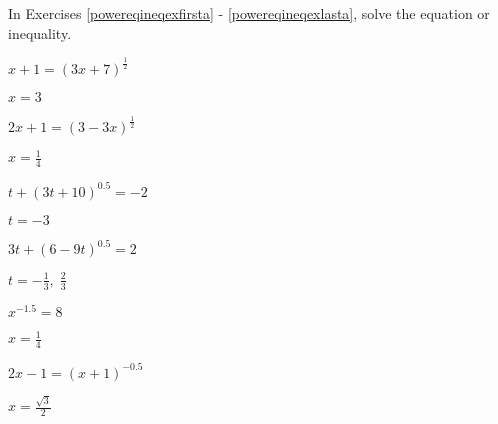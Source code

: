 \documentclass{ximera}
\begin{document}
	\author{Stitz-Zeager}



In Exercises \ref{powereqineqexfirsta} - \ref{powereqineqexlasta}, solve the equation or inequality.  





\begin{question}
$x+1 = (3x+7)^{\frac{1}{2}}$
\begin{solution}
$x=3$  
\end{solution}

\end{question}

\begin{question}
$2x+1 = (3-3x)^{\frac{1}{2}}$

\begin{solution}
$x = \frac{1}{4}$
\end{solution}

\end{question}

\begin{question}
$t + (3t+10)^{0.5} = -2$
\begin{solution}
$t=-3$  

\end{solution}

\end{question}

\begin{question}
$3t+(6-9t)^{0.5}=2$

\begin{solution}
$t = -\frac{1}{3}, \; \frac{2}{3}$  
\end{solution}

\end{question}

\begin{question}
$x^{-1.5} = 8$
\begin{solution}
$x = \frac{1}{4}$  
\end{solution}

\end{question}

\begin{question}
$2x - 1 =  (x + 1)^{-0.5}$

\begin{solution}
$x = \frac{\sqrt{3}}{2}$

\end{solution}

\end{question}
\end{document}
